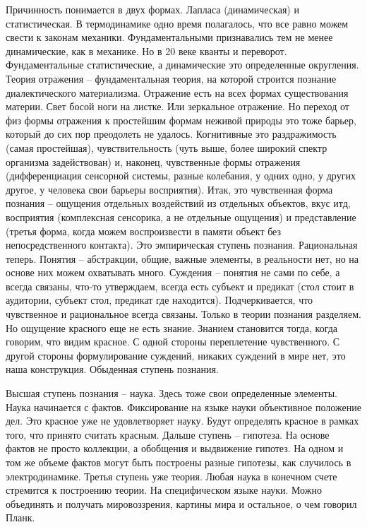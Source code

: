 \documentclass[a4paper, 12pt]{article}
\begin{document}
Причинность понимается в двух формах. Лапласа (динамическая) 
и статистическая. В термодинамике одно время полагалось, что все равно 
можем свести к законам механики. Фундаментальными признавались тем не 
менее динамические, как в механике. Но в 20 веке кванты и переворот. 
Фундаментальные статистические, а динамические это определенные 
округления. Теория отражения -- фундаментальная теория, на которой 
строится познание диалектического материализма. Отражение есть на всех 
формах существования материи. Свет босой ноги на листке. Или зеркальное 
отражение. Но переход от физ формы отражения к простейшим формам неживой 
природы это тоже барьер, который до сих пор преодолеть не удалось. 
Когнитивные это раздражимость (самая простейшая), чувствительность (чуть 
выше, более широкий спектр организма задействован) и, наконец, 
чувственные формы отражения (дифференциация сенсорной системы, разные 
колебания, у одних одно, у других другое, у человека свои барьеры 
восприятия). Итак, это чувственная форма познания -- ощущения отдельных 
воздействий из отдельных объектов, вкус итд, восприятия (комплексная 
сенсорика, а не отдельные ощущения) и представление (третья форма, когда 
можем воспроизвести в памяти объект без непосредственного контакта). Это 
эмпирическая ступень познания. Рациональная теперь. Понятия -- 
абстракции, общие, важные элементы, в реальности нет, но на основе них 
можем охватывать много. Суждения -- понятия не сами по себе, а всегда 
связаны, что-то утверждаем, всегда есть субъект и предикат (стол стоит 
в аудитории, субъект стол, предикат где находится). Подчеркивается, что 
чувственное и рациональное всегда связаны. Только в теории познания 
разделяем. Но ощущение красного еще не есть знание. Знанием становится 
тогда, когда говорим, что видим красное. С одной стороны переплетение 
чувственного. С другой стороны формулирование суждений, никаких суждений 
в мире нет, это наша конструкция. Обыденная ступень познания.

Высшая ступень познания -- наука. Здесь тоже свои определенные элементы. 
Наука начинается с фактов. Фиксирование на языке науки объективное 
положение дел. Это красное уже не удовлетворяет науку. Будут определять 
красное в рамках того, что принято считать красным. Дальше ступень -- 
гипотеза. На основе фактов не просто коллекции, а обобщения и выдвижение 
гипотез. На одном и том же объеме фактов могут быть построены разные 
гипотезы, как случилось в электродинамике. Третья ступень уже теория. 
Любая наука в конечном счете стремится к построению теории. На 
специфическом языке науки. Можно объединять и получать мировоззрения, 
картины мира и остальное, о чем говорил Планк.
\end{document}
